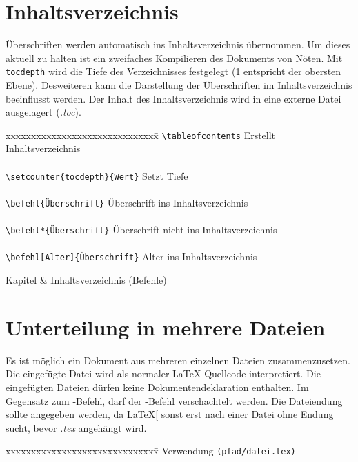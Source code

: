 \section{Inhaltsverzeichnis}\label{TOC}
Überschriften werden automatisch ins Inhaltsverzeichnis übernommen. Um dieses aktuell zu halten ist ein zweifaches Kompilieren des Dokuments von Nöten. Mit \texttt{tocdepth} wird die Tiefe des Verzeichnisses festgelegt (1 entspricht der obersten Ebene). Desweiteren kann die Darstellung der Überschriften im Inhaltsverzeichnis beeinflusst werden. Der Inhalt des Inhaltsverzeichnis wird in eine externe Datei ausgelagert (\textit{.toc}).
\begin{table}[H]
\begin{tabbing}
xxxxxxxxxxxxxxxxxxxxxxxxxxxxxx\=\kill
\verb=\tableofcontents=				\>Erstellt Inhaltsverzeichnis\\
\\
\verb=\setcounter{tocdepth}{Wert}=		\>Setzt Tiefe\\
\\
\verb=\befehl{Überschrift}=				\>Überschrift ins Inhaltsverzeichnis\\
\\
\verb=\befehl*{Überschrift}=			\>Überschrift nicht ins Inhaltsverzeichnis\\
\\
\verb=\befehl[Alter]{Überschrift}=		\>Alter ins Inhaltsverzeichnis\\
\end{tabbing}
\caption{Kapitel \& Inhaltsverzeichnis (Befehle)}
\end{table}

\section{Unterteilung in mehrere Dateien}
Es ist möglich ein Dokument aus mehreren einzelnen Dateien zusammenzusetzen. Die eingefügte Datei wird als normaler \LaTeX{}-Quellcode interpretiert. Die eingefügten Dateien dürfen keine Dokumentendeklaration enthalten. Im Gegensatz zum \verb==-Befehl, darf der \verb==-Befehl verschachtelt werden. Die Dateiendung sollte angegeben werden, da \LaTeX[{} sonst erst nach einer Datei ohne Endung sucht, bevor \textit{.tex} angehängt wird.
\begin{tabbing}
xxxxxxxxxxxxxxxxxxxxxxxxxxxxxx\=\kill
Verwendung				\>\verb=(pfad/datei.tex)=\\
\end{tabbing}